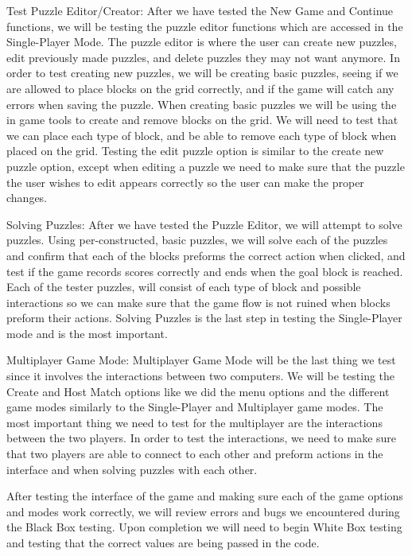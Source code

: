 \documentclass[12pt]{article}
\begin{document}
Test Puzzle Editor/Creator:
After we have tested the New Game and Continue functions, we will be testing the puzzle editor functions which are accessed in the Single-Player Mode. The puzzle editor is where the user can create new puzzles, edit previously made puzzles, and delete puzzles they may not want anymore. In order to test creating new puzzles, we will be creating basic puzzles, seeing if we are allowed to place blocks on the grid correctly, and if the game will catch any errors when saving the puzzle. When creating basic puzzles we will be using the in game tools to create and remove blocks on the grid. We will need to test that we can place each type of block, and be able to remove each type of block when placed on the grid.
Testing the edit puzzle option is similar to the create new puzzle option, except when editing a puzzle we need to make sure that the puzzle the user wishes to edit appears correctly so the user can make the proper changes.

Solving Puzzles:
After we have tested the Puzzle Editor, we will attempt to solve puzzles. Using per-constructed, basic puzzles, we will solve each of the puzzles and confirm that each of the blocks preforms the correct action when clicked, and test if the game records scores correctly and ends when the goal block is reached. Each of the tester puzzles, will consist of each type of block and possible interactions so we can make sure that the game flow is not ruined when blocks preform their actions. Solving Puzzles is the last step in testing the Single-Player mode and is the most important.

Multiplayer Game Mode:
Multiplayer Game Mode will be the last thing we test since it involves the interactions between two computers. We will be testing the Create and Host Match options like we did the menu options and the different game modes similarly to the Single-Player and Multiplayer game modes. The most important thing we need to test for the multiplayer are the interactions between the two players. In order to test the interactions, we need to make sure that two players are able to connect to each other and preform actions in the interface and when solving puzzles with each other.

After testing the interface of the game and making sure each of the game options and modes work correctly, we will review errors and bugs we encountered during the Black Box testing. Upon completion we will need to begin White Box testing and testing that the correct values are being passed in the code.
\end{document}

